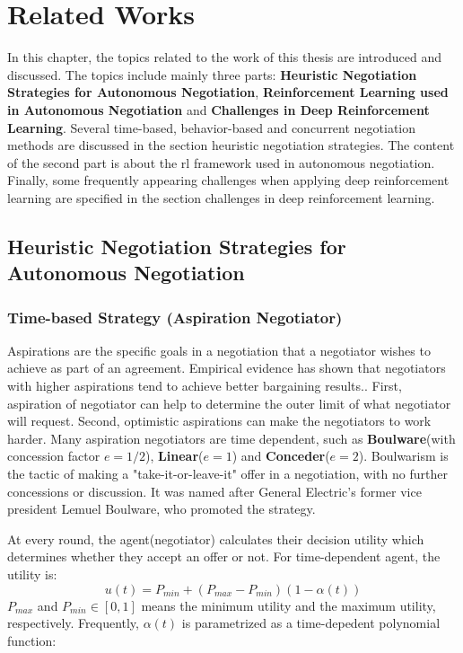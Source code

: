 \chapter{Related Works}
In this chapter, the topics related to the work of this thesis are introduced and discussed. The topics include mainly three parts: \textbf{Heuristic Negotiation Strategies for Autonomous Negotiation}, \textbf{Reinforcement Learning used in Autonomous Negotiation} and \textbf{Challenges in Deep Reinforcement Learning}. Several time-based, behavior-based and concurrent negotiation methods are discussed in the section heuristic negotiation strategies. The content of the second part is about the \gls{rl} framework used in autonomous negotiation. Finally, some frequently appearing challenges when applying deep reinforcement learning are specified in the section challenges in deep reinforcement learning.

\section{Heuristic Negotiation Strategies for Autonomous Negotiation} \label{related-work:heuristic-negotiation}
\subsection{Time-based Strategy (Aspiration Negotiator)}
Aspirations are the specific goals in a negotiation that a negotiator wishes to achieve as part of an agreement. Empirical evidence has shown that negotiators with higher aspirations tend to achieve better bargaining results.. First, aspiration of negotiator can help to determine the outer limit of what negotiator will request. Second, optimistic aspirations can make the negotiators to work harder\parencite{Schneider2004}. Many aspiration negotiators are time dependent, such as \textbf{Boulware}(with concession factor $e=1/2$), \textbf{Linear}($e=1$) and \textbf{Conceder}($e=2$)\parencite{FARATIN1998159}. Boulwarism is the tactic of making a "take-it-or-leave-it" offer in a negotiation, with no further concessions or discussion. It was named after General Electric's former vice president Lemuel Boulware, who promoted the strategy\parencite{William1991}.

At every round, the agent(negotiator) calculates their decision utility which determines whether they accept an offer or not. For time-dependent agent, the utility is:
\begin{equation}
u(t) = P_{min} + (P_{max} - P_{min})(1-\alpha(t))
\end{equation}
$P_{max}$ and $P_{min} \in [0, 1]$ means the minimum utility and the maximum utility, respectively. Frequently, $\alpha(t)$ is parametrized as a time-depedent polynomial function\parencite{chang2020multiissue, FARATIN1998159}: 

